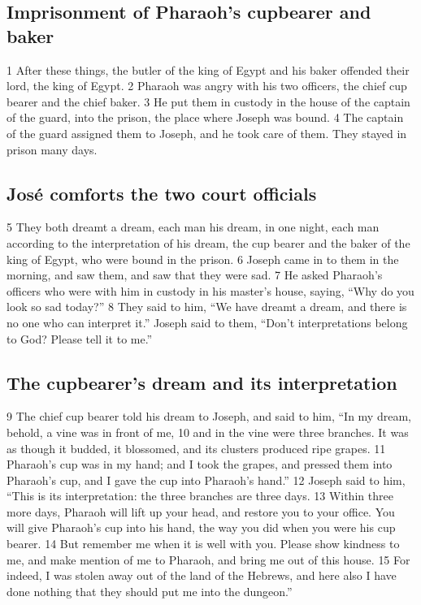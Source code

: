 \hypertarget{imprisonment-of-pharaohs-cupbearer-and-baker}{%
\subsection{Imprisonment of Pharaoh's cupbearer and
baker}\label{imprisonment-of-pharaohs-cupbearer-and-baker}}

{1} After these things, the butler of the king of Egypt and his baker
offended their lord, the king of Egypt. {2} Pharaoh was angry with his
two officers, the chief cup bearer and the chief baker. {3} He put them
in custody in the house of the captain of the guard, into the prison,
the place where Joseph was bound. {4} The captain of the guard assigned
them to Joseph, and he took care of them. They stayed in prison many
days.

\hypertarget{josuxe9-comforts-the-two-court-officials}{%
\subsection{José comforts the two court
officials}\label{josuxe9-comforts-the-two-court-officials}}

{5} They both dreamt a dream, each man his dream, in one night, each man
according to the interpretation of his dream, the cup bearer and the
baker of the king of Egypt, who were bound in the prison. {6} Joseph
came in to them in the morning, and saw them, and saw that they were
sad. {7} He asked Pharaoh's officers who were with him in custody in his
master's house, saying, ``Why do you look so sad today?'' {8} They said
to him, ``We have dreamt a dream, and there is no one who can interpret
it.'' Joseph said to them, ``Don't interpretations belong to God? Please
tell it to me.''

\hypertarget{the-cupbearers-dream-and-its-interpretation}{%
\subsection{The cupbearer's dream and its
interpretation}\label{the-cupbearers-dream-and-its-interpretation}}

{9} The chief cup bearer told his dream to Joseph, and said to him, ``In
my dream, behold, a vine was in front of me, {10} and in the vine were
three branches. It was as though it budded, it blossomed, and its
clusters produced ripe grapes. {11} Pharaoh's cup was in my hand; and I
took the grapes, and pressed them into Pharaoh's cup, and I gave the cup
into Pharaoh's hand.'' {12} Joseph said to him, ``This is its
interpretation: the three branches are three days. {13} Within three
more days, Pharaoh will lift up your head, and restore you to your
office. You will give Pharaoh's cup into his hand, the way you did when
you were his cup bearer. {14} But remember me when it is well with you.
Please show kindness to me, and make mention of me to Pharaoh, and bring
me out of this house. {15} For indeed, I was stolen away out of the land
of the Hebrews, and here also I have done nothing that they should put
me into the dungeon.''


